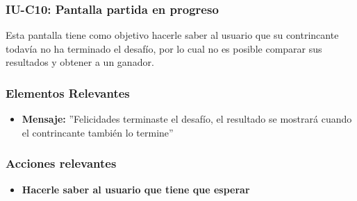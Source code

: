 
\subsubsection{IU-C10: Pantalla partida en progreso}

 Esta pantalla tiene como objetivo hacerle saber al usuario que su contrincante todavía no ha terminado el desafío, por lo cual no es posible comparar sus resultados y obtener a un ganador.


\subsubsection{Elementos Relevantes}

    \begin{itemize}
    \item {\bf Mensaje:} ''Felicidades terminaste el desafío, el resultado se mostrará cuando el contrincante también lo termine''
    \end{itemize}

\subsubsection{Acciones relevantes}

    \begin{itemize}
    \item {\bf Hacerle saber al usuario que tiene que esperar}

    \end{itemize}

\clearpage
